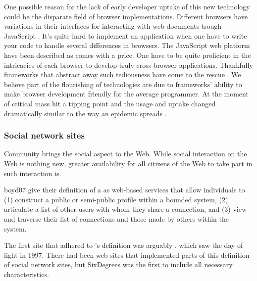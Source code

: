 One possible reason for the lack of early developer uptake of this new
technology could be the disparate field of browser implementations.
Different browsers have variations in their interfaces for interacting with
web documents trough JavaScript%
. It's quite hard to implement an application
when one have to write your code to handle several differences in browsers.
The JavaScript web platform have been described as
 comes with a price. One have to be quite proficient in the
intricacies of each browser to develop truly cross-browser applications.
Thankfully frameworks that abstract away such tediousness have come to
the rescue \citet[]{mesbah07}. We believe part of the flourishing of
 technologies are due to frameworks' ability to make browser
development friendly for the average programmer. At the moment of critical
mass  hit a tipping point and the usage and uptake changed
dramatically similar to the way an epidemic spreads
\citep[]{gladwell02}.

\subsubsection{Social network sites}
\label{section:background.sociality.the.social.web.social.network.sites}
Community brings the social aspect to the Web. While social
interaction on the Web is nothing new, greater availability for all
citizens of the Web to take part in such interaction is.

\begin{fullquote}{boyd07}{%
  give their definition of a  as}
    web-based services that allow individuals to (1) construct a public
    or semi-public profile within a bounded system, (2) articulate a list of
    other users with whom they share a connection, and (3) view and traverse
    their list of connections and those made by others within the system.
\end{fullquote}

The first site that adhered to \citeauthor{boyd07}'s definition was arguably
, which saw the day of light in 1997.%
There had been web sites that implemented
parts of this definition of social network sites, but SixDegrees was the
first to include all necessary characteristics.

